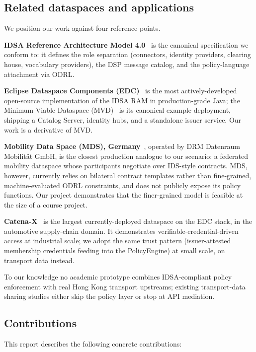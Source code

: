\documentclass[11pt,a4paper]{article}
\begin{document}
\subsection{Related dataspaces and applications}
\label{sec:related}

We position our work against four reference points.

\textbf{IDSA Reference Architecture Model 4.0}~\cite{idsa-ram4} is the
canonical specification we conform to: it defines the role separation
(connectors, identity providers, clearing house, vocabulary providers), the
DSP message catalog, and the policy-language attachment via ODRL.

\textbf{Eclipse Dataspace Components (EDC)}~\cite{edc-project} is the most
actively-developed open-source implementation of the IDSA RAM in
production-grade Java; the Minimum Viable Dataspace (MVD)~\cite{edc-mvd} is
its canonical example deployment, shipping a Catalog Server, identity hubs,
and a standalone issuer service. Our work is a derivative of MVD.

\textbf{Mobility Data Space (MDS), Germany}~\cite{mds-de}, operated by DRM
Datenraum Mobilität GmbH, is the closest production analogue to our scenario:
a federated mobility dataspace whose participants negotiate over IDS-style
contracts. MDS, however, currently relies on bilateral contract templates
rather than fine-grained, machine-evaluated ODRL constraints, and does not
publicly expose its policy functions. Our project demonstrates that the
finer-grained model is feasible at the size of a course project.

\textbf{Catena-X}~\cite{catenax} is the largest currently-deployed dataspace
on the EDC stack, in the automotive supply-chain domain. It demonstrates
verifiable-credential-driven access at industrial scale; we adopt the same
trust pattern (issuer-attested membership credentials feeding into the
PolicyEngine) at small scale, on transport data instead.

To our knowledge no academic prototype combines IDSA-compliant policy
enforcement with real Hong Kong transport upstreams; existing transport-data
sharing studies either skip the policy layer or stop at API mediation.

\subsection{Contributions}

This report describes the following concrete contributions:
\end{document}
